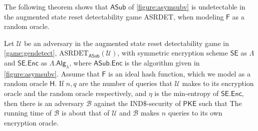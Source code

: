 The following theorem shows that $\mathsf{ASub}$ of \autoref{figure:asymsubv} is undetectable in the augmented state reset detectability game ASRDET, when modeling $\mathsf{F}$ as a random oracle.

\begin{theorem} \label{theorem:detect}
Let $\mathcal{U}$ be an adversary in the augmented state reset detectability game in \autoref{game:gendetect}, $\mathrm{ASRDET}_\mathsf{ASub}(\mathcal{U})$, with symmetric encryption scheme $\mathsf{SE}$ as $\mathsf{\Lambda}$ and $\mathsf{SE.Enc}$ as $\mathsf{\Lambda.Alg}_\lambda$, where $\mathsf{ASub.Enc}$ is the algorithm given in \autoref{figure:asymsubv}. Assume that $\mathsf{F}$ is an ideal hash function, which we model as a random oracle $\mathsf{H}$. If $n,q$ are the number of queries that $\mathcal{U}$ makes to its encryption oracle and the random oracle respectively, and $\eta$ is the min-entropy of $\mathsf{SE.Enc}$, then there is an adversary $\mathcal{B}$ against the $\mathrm{IND\$}$-security of $\mathsf{PKE}$ such that
The running time of $\mathcal{B}$ is about that of $\mathcal{U}$ and $\mathcal{B}$ makes $n$ queries to its own encryption oracle.
\end{theorem}


